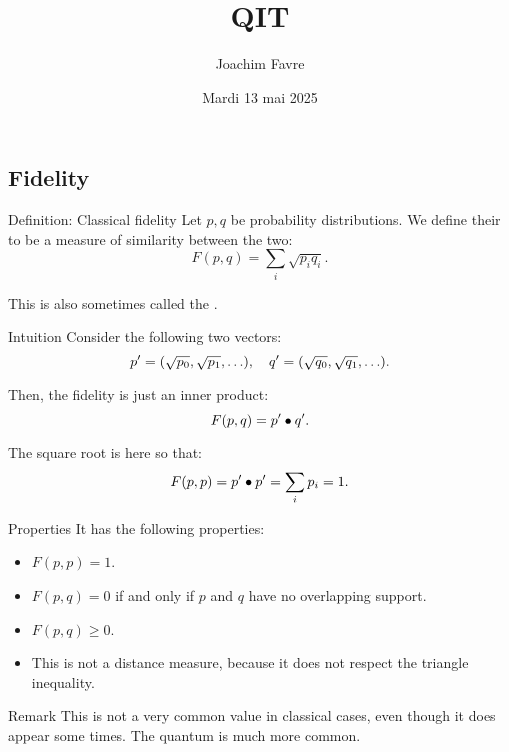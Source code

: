 \documentclass[a4paper]{article}
\title{QIT}
\author{Joachim Favre}
\date{Mardi 13 mai 2025}
\begin{document}
\maketitle


\subsection{Fidelity}

\begin{parag}{Definition: Classical fidelity}
    Let $p, q$ be probability distributions. We define their  to be a measure of similarity between the two: 
    \[F\left(p, q\right) = \sum_{i} \sqrt{p_i q_i}.\]

    This is also sometimes called the .

    \begin{subparag}{Intuition}
        Consider the following two vectors: 
        \[p' = \left(\sqrt{p_0}, \sqrt{p_1}, \ldots\right), \mathspace q' = \left(\sqrt{q_0}, \sqrt{q_1}, \ldots\right).\]
        
        Then, the fidelity is just an inner product: 
        \[F\left(p, q\right) = p' \dotprod q'.\]

        The square root is here so that: 
        \[F\left(p, p\right) = p' \dotprod p' = \sum_{i} p_i = 1.\]
    \end{subparag}

    \begin{subparag}{Properties}
        It has the following properties:
        \begin{itemize}
            \item $F\left(p, p\right) = 1$.
            \item $F\left(p, q\right) = 0$ if and only if $p$ and $q$ have no overlapping support.
            \item $F\left(p, q\right) \geq 0$.
            \item This is not a distance measure, because it does not respect the triangle inequality.
        \end{itemize}
    \end{subparag}

    \begin{subparag}{Remark}
        This is not a very common value in classical cases, even though it does appear some times. The quantum is much more common.
    \end{subparag}
\end{parag}
\end{document}
